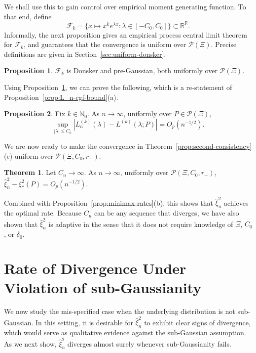 \documentclass{article}
\theoremstyle{definition}
\newtheorem{theorem}{Theorem}
\newtheorem{proposition}{Proposition}
\newcommand{\R}{\mathbb{R}}
\newcommand{\N}{\mathbb{N}}
\newcommand{\1}{\mathbbm{1}}
\begin{document}
We shall use this to gain control over empirical moment generating function. To that end, define
\[
\mathcal F_k = \{x \mapsto x^ke^{\lambda x}: \lambda \in [-C_0, C_0]\} \subset \R^\R.
\]
Informally, the next proposition gives an empirical process central limit theorem for $\mathcal F_k$, and guarantees that the convergence is uniform over $\mathcal P(\Xi)$. Precise definitions are given in Section~\ref{sec:uniform-donsker}. 
\begin{proposition}
\label{prop:mgf-uniform-donsker}
    $\mathcal F_k$ is Donsker and pre-Gaussian, both uniformly over $\mathcal P(\Xi)$. 
\end{proposition}
Using Proposition~\ref{prop:mgf-uniform-donsker}, we can prove the following, which is a re-statement of Proposition~\ref{prop:L_n-cgf-bound}(a). 
\begin{proposition}
\label{prop:L_n-uniform-rootn}
Fix $k \in \N_0$. As $n \to \infty$, uniformly over $P \in \mathcal P(\Xi)$,
    \[
     \sup_{|\lambda| \leq C_0} |L_n^{(k)}(\lambda) - L^{(k)}(\lambda; P)| = O_p(n^{-1/2}).
    \]
\end{proposition}


We are now ready to make the convergence in Theorem~\ref{prop:second-consistency}(c) uniform over $\mathcal P(\Xi, C_0, r_-)$. 
\begin{theorem}
\label{prop:hat xi-minimax-optimality}
    Let $C_n \to \infty$. As $n \to \infty$, uniformly over $\mathcal P(\Xi, C_0, r_-)$, $\hat \xi_n^2 - \xi_*^2(P) = O_p(n^{-1/2})$.
\end{theorem}
Combined with Proposition~\ref{prop:minimax-rates}(b), this shows that $\hat \xi^2_n$ achieves the optimal rate. Because $C_n$ can be any sequence that diverges, we have also shown that $\hat \xi^2_n$ is adaptive in the sense that it does not require knowledge of $\Xi$, $C_0$, or $\delta_0$.
\section{Rate of Divergence Under Violation of sub-Gaussianity}
We now study the mis-specified case when the underlying distribution is not sub-Gaussian. In this setting, it is desirable for $\hat \xi^2_n$ to exhibit clear signs of divergence, which 
would serve as qualitative evidence against the sub-Gaussian assumption. As we next 
show, $\hat\xi^2_n$ diverges almost surely whenever sub-Gaussianity fails.
\end{document}
